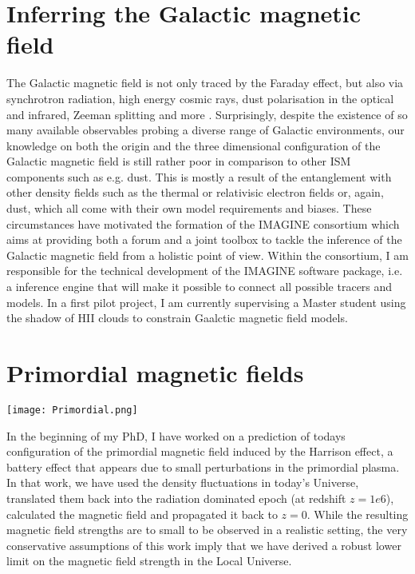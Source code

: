 \section{Inferring the Galactic magnetic field}

The Galactic magnetic field is not only traced by the Faraday effect, but also via synchrotron radiation, high energy cosmic rays, dust polarisation in the optical and infrared, Zeeman splitting and more \citep{2013Beck}.
Surprisingly, despite the existence of so many available observables probing a diverse range of Galactic environments, our knowledge on both the origin and the three dimensional configuration of the Galactic magnetic field is still rather poor in comparison to other ISM components such as e.g. dust.
This is mostly a result of the entanglement with other density fields such as the thermal or relativisic electron fields or, again, dust, which all come with their own model requirements and biases.
These circumstances have motivated the formation of the IMAGINE consortium \citep{2018Boulanger} which aims at providing both a forum and a joint toolbox to tackle the inference of the Galactic magnetic field from a holistic point of view.
Within the consortium, I am responsible for the technical development of the IMAGINE software package, i.e. a inference engine that will make it possible to connect all possible tracers and models.
In a first pilot project, I am currently supervising a Master student using the shadow of HII clouds to constrain Gaalctic magnetic field models.

\section{Primordial magnetic fields}

\begin{center}
  \texttt{[image: Primordial.png]}
\end{center}

In the beginning of my PhD, I have worked on a prediction of todays configuration of the primordial magnetic field induced by the Harrison effect, a battery effect that appears due to small perturbations in the primordial plasma.
In that work, we have used the density fluctuations in today's Universe, translated them back into the radiation dominated epoch (at redshift $z=1e6$), calculated the magnetic field and propagated it back to $z=0$.
While the resulting magnetic field strengths are to small to be observed in a realistic setting, the very conservative assumptions of this work imply that we have derived a robust lower limit on the magnetic field strength in the Local Universe.

